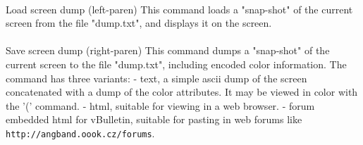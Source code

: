 \paragraph{}Load screen dump (left-paren) This command loads a
"snap-shot" of the current screen from the file "dump.txt", and displays
it on the screen.

\paragraph{}Save screen dump (right-paren) This command dumps a
"snap-shot" of the current screen to the file "dump.txt", including
encoded color information. The command has three variants: - text, a
simple ascii dump of the screen concatenated with a dump of the color
attributes. It may be viewed in color with the '(' command.  - html,
suitable for viewing in a web browser.  - forum embedded html for
vBulletin, suitable for pasting in web forums like
\verb+http://angband.oook.cz/forums+.


